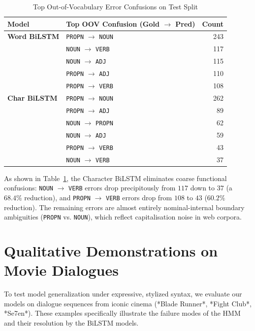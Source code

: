 \documentclass[conference]{IEEEtran}
\begin{document}
\begin{table}[htbp]
\caption{Top Out-of-Vocabulary Error Confusions on Test Split}
\label{tab:oov_confusions}
\centering
\footnotesize
\setlength{\tabcolsep}{2.5pt}
\begin{tabular}{llr}
\toprule
\textbf{Model} & \textbf{Top OOV Confusion (Gold $\rightarrow$ Pred)} & \textbf{Count} \\
\midrule
\textbf{Word BiLSTM} 
& \texttt{PROPN} $\rightarrow$ \texttt{NOUN} & 243 \\
& \texttt{NOUN} $\rightarrow$ \texttt{VERB}  & 117 \\
& \texttt{NOUN} $\rightarrow$ \texttt{ADJ}   & 115 \\
& \texttt{PROPN} $\rightarrow$ \texttt{ADJ}  & 110 \\
& \texttt{PROPN} $\rightarrow$ \texttt{VERB} & 108 \\
\midrule
\textbf{Char BiLSTM} 
& \texttt{PROPN} $\rightarrow$ \texttt{NOUN} & 262 \\
& \texttt{PROPN} $\rightarrow$ \texttt{ADJ}  & 89 \\
& \texttt{NOUN} $\rightarrow$ \texttt{PROPN}  & 62 \\
& \texttt{NOUN} $\rightarrow$ \texttt{ADJ}   & 59 \\
& \texttt{PROPN} $\rightarrow$ \texttt{VERB} & 43 \\
& \texttt{NOUN} $\rightarrow$ \texttt{VERB}  & 37 \\
\bottomrule
\end{tabular}
\end{table}

As shown in Table~\ref{tab:oov_confusions}, the Character BiLSTM eliminates coarse functional confusions: \texttt{NOUN} $\rightarrow$ \texttt{VERB} errors drop precipitously from $117$ down to $37$ (a $68.4\%$ reduction), and \texttt{PROPN} $\rightarrow$ \texttt{VERB} errors drop from $108$ to $43$ ($60.2\%$ reduction). The remaining errors are almost entirely nominal-internal boundary ambiguities (\texttt{PROPN} vs. \texttt{NOUN}), which reflect capitalisation noise in web corpora.

\section{Qualitative Demonstrations on Movie Dialogues}
To test model generalization under expressive, stylized syntax, we evaluate our models on dialogue sequences from iconic cinema (*Blade Runner*, *Fight Club*, *Se7en*). These examples specifically illustrate the failure modes of the HMM and their resolution by the BiLSTM models.
\end{document}
